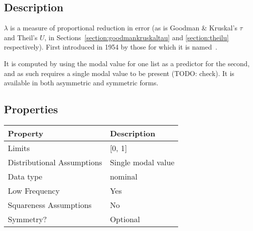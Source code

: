 \documentclass[11pt]{article}
\begin{document}
\subsection{Description}
$\lambda$ is a measure of proportional reduction in error (as is Goodman \& Kruskal's $\tau$ and Theil's $U$, in Sections~\ref{section:goodmankruskaltau} and \ref{section:theilu} respectively).  First introduced in 1954 by those for which it is named~\cite{goodman1954measures}.

It is computed by using the modal value for one list as a predictor for the second, and as such requires a single modal value to be present (TODO: check).  It is available in both asymmetric and symmetric forms.


\subsection{Properties}
\begin{tabular}{| l || l |}
    \hline
    {\bf Property} & {\bf Description} \\
    \hline
    Limits & [0, 1] \\ \hline

    Distributional Assumptions& Single modal value \\ \hline

    Data type & nominal \\ \hline

    Low Frequency & Yes \\ \hline

    Squareness Assumptions & No \\ \hline
    
    Symmetry? &  Optional \\ \hline

\end{tabular}
\end{document}
